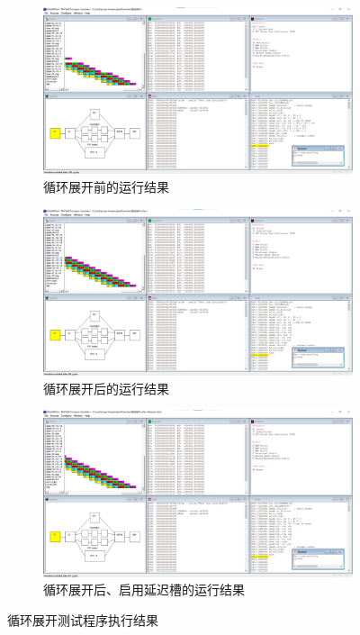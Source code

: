 \documentclass{ctexrep}
\begin{document}
\begin{figure}
    \centering
    \begin{subfigure}{0.8\linewidth}
        \includegraphics[width=\linewidth]{loop_unrolling_before.png}
        \caption{循环展开前的运行结果}
    \end{subfigure}
    \begin{subfigure}{0.8\linewidth}
        \includegraphics[width=\linewidth]{loop_unrolling_after.png}
        \caption{循环展开后的运行结果}
    \end{subfigure}
    \begin{subfigure}{0.8\linewidth}
        \includegraphics[width=\linewidth]{loop_unrolling_ds.png}
        \caption{循环展开后、启用延迟槽的运行结果}
    \end{subfigure}
    \caption{循环展开测试程序执行结果}
    \label{fig:lu}
\end{figure}
\end{document}
